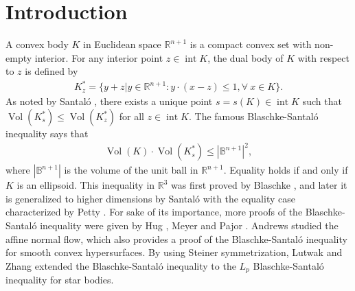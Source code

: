 \documentclass[11pt,reqno]{amsart}
\theoremstyle{definition}
\theoremstyle{remark}
\numberwithin{equation}{section}
\renewcommand{\(}{\left(}
\renewcommand{\)}{\right)}
\renewcommand{\~}{\tilde}
\renewcommand{\-}{\overline}
\newcommand{\Vol}{\operatorname{Vol}}
\begin{document}
\section{Introduction}
A convex body $K$ in Euclidean space $\mathbb R^{n+1}$ is a compact convex set with non-empty interior. For any interior point $z\in \operatorname{int}K$, the dual body of $K$ with respect to $z$ is defined by
\begin{align*}
K_z^\ast=\{ y+z | y\in \mathbb R^{n+1} : y\cdot (x-z)\leq 1, \forall ~x\in K \}.
\end{align*}
As noted by Santal\'o \cite{Sant1949}, there exists a unique point $s=s(K)\in \operatorname{int}K$ such that $\Vol(K_s^\ast)\leq \Vol(K_z^\ast)$ for all $z\in \operatorname{int}K$. The famous Blaschke-Santal\'o inequality says that
\begin{align}\label{s1:Blaschke-Santalo-ineq}
\Vol(K) \cdot \Vol(K_s^\ast) \leq |\mathbb B^{n+1}|^2,
\end{align}
where $|\mathbb B^{n+1}|$ is the volume of the unit ball in $\mathbb R^{n+1}$. Equality holds if and only if $K$ is an ellipsoid. This inequality in $\mathbb R^3$ was first proved by Blaschke \cite{Blaschke1917}, and later it is generalized to higher dimensions by Santal\'o \cite{Sant1949} with the equality case characterized by Petty \cite{Petty1985}. For sake of its importance, more proofs of the Blaschke-Santal\'o inequality were given by Hug \cite{Hug1996}, Meyer and Pajor \cite{Meyer-Pojor1990}. Andrews \cite{And96} studied the affine normal flow, which also provides a proof of the Blaschke-Santal\'o inequality for smooth convex hypersurfaces. By using Steiner symmetrization, Lutwak and Zhang \cite{Lutwak-Zhang1997} extended the Blaschke-Santal\'o inequality to the $L_p$ Blaschke-Santal\'o inequality for star bodies.
\end{document}
